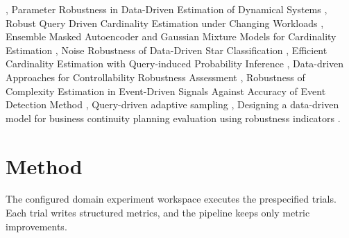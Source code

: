 \documentclass{article}
\begin{document}
\cite{anagnostopoulos2017querydriven93023461}, Parameter Robustness in Data-Driven Estimation of Dynamical Systems \cite{pandey2025parameter02966b6b}, Robust Query Driven Cardinality Estimation under Changing Workloads \cite{negi2023robustb459fb97}, Ensemble Masked Autoencoder and Gaussian Mixture Models for Cardinality Estimation \cite{chen2023ensemble4ef66dd0}, Noise Robustness of Data-Driven Star Classification \cite{hepburndickins2023noise8c77a204}, Efficient Cardinality Estimation with Query-induced Probability Inference \cite{liu2025efficient28de3428}, Data-driven Approaches for Controllability Robustness Assessment \cite{paper2026datadriven3e843625}, Robustness of Complexity Estimation in Event-Driven Signals Against Accuracy of Event Detection Method \cite{paradisi2025robustness08859da6}, Query-driven adaptive sampling \cite{aytonndquerydrivenb454bf4c}, Designing a data-driven model for business continuity planning evaluation using robustness indicators \cite{amaranddesigning73161c62}.

\section{Method}
The configured domain experiment workspace executes the prespecified trials.
Each trial writes structured metrics, and the pipeline keeps only metric improvements.
\end{document}
